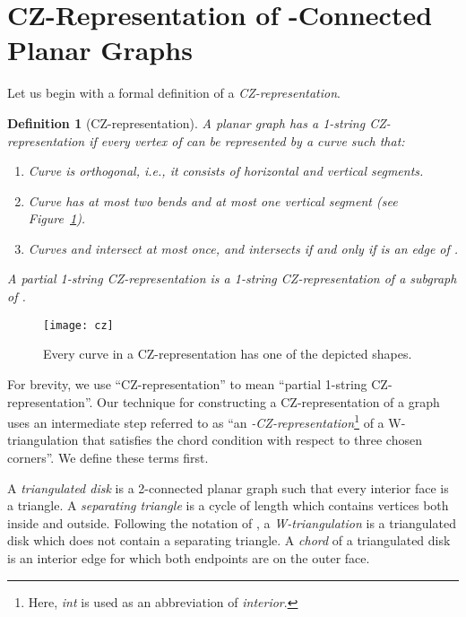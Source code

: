 \documentclass{article}
\renewcommand{\int}[1]{}
\newtheorem{definition}[theorem]{Definition}
\begin{document}
\section{CZ-Representation of -Connected Planar Graphs}
\label{sec:def}

Let us begin with a formal definition of a \emph{CZ-representation}.

\begin{definition}[CZ-representation]
\label{def:repre}
 A planar graph  has a \emph{1-string CZ-representation} if every vertex  of  can be
 represented by a curve  such that: \begin{enumerate}
    \item Curve  is \emph{orthogonal}, i.e., it consists of horizontal and vertical segments.
    \item Curve  has at most two bends and at most one vertical segment (see Figure~\ref{fig:cz-curve}).
    \item Curves  and  intersect at most once, and  intersects  if and
	only if  is an edge of .
 \end{enumerate}
A {\em partial 1-string CZ-representation} is a 1-string CZ-representation of a subgraph of .
 \end{definition}

\begin{figure}
\centering
    \texttt{[image: cz]}
    \caption{Every curve in a CZ-representation has one of the depicted shapes.}
    \label{fig:cz-curve}
\end{figure}

For brevity, we use ``CZ-representation'' to mean ``partial 1-string 
CZ-repre\-sentation''.
Our technique for constructing a CZ-representation of a graph uses an intermediate step
referred to as ``an \emph{\int{F}-CZ-representation}\footnote{Here, \emph{int} is used as an abbreviation of \emph{interior}.} of a
W-triangulation that satisfies the chord condition with respect to
three chosen corners''.
We define these terms first. 

A \emph{triangulated disk} is a 2-connected planar graph  such that every 
interior face is a triangle. 
A {\em separating triangle} is a cycle of length  which contains vertices
both inside and outside.   Following the notation of
\cite{cit:chalopin-string}, a \emph{W-triangulation} is a triangulated disk
which does not contain a separating triangle.
A {\em chord} of a triangulated disk is an
interior edge for which both endpoints are on the outer face.
\end{document}
